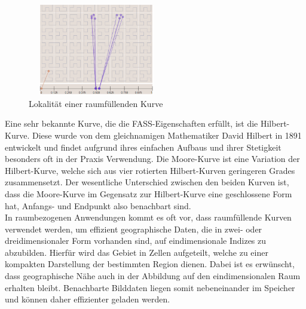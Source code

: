 \documentclass[course=erap]{aspdoc}
\begin{document}
\begin{figure}[h]
\centering
      \includegraphics[width=6cm, height=4cm]{Locality}
    \caption{Lokalität einer raumfüllenden Kurve \cite{pic:locality}}
    \label{fig:locality}
\end{figure}

Eine sehr bekannte Kurve, die die FASS-Eigenschaften erfüllt, ist die Hilbert-Kurve. Diese wurde von dem gleichnamigen Mathematiker David Hilbert in 1891 entwickelt und findet aufgrund ihres einfachen Aufbaus und ihrer Stetigkeit besonders oft in der Praxis Verwendung.
\newline
Die Moore-Kurve ist eine Variation der Hilbert-Kurve, welche sich aus vier rotierten Hilbert-Kurven geringeren Grades zusammensetzt. 
Der wesentliche Unterschied zwischen den beiden Kurven ist, dass die Moore-Kurve im Gegensatz zur Hilbert-Kurve eine geschlossene Form hat, Anfangs- und Endpunkt also benachbart sind.
\\
In raumbezogenen Anwendungen kommt es oft vor, dass raumfüllende Kurven verwendet werden, um effizient geographische Daten, die in zwei- oder dreidimensionaler Form vorhanden sind, auf eindimensionale Indizes zu abzubilden. Hierfür wird das Gebiet in Zellen aufgeteilt, welche zu einer kompakten Darstellung der bestimmten Region dienen. Dabei ist es erwünscht, dass geographische Nähe auch in der Abbildung auf den eindimensionalen Raum erhalten bleibt. Benachbarte Bilddaten liegen somit nebeneinander im Speicher und können daher effizienter geladen werden.
\end{document}

